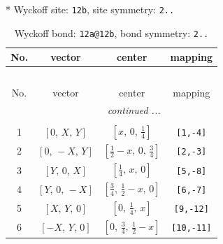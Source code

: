 \documentclass[fleqn,8pt]{jsarticle}
\begin{document}
* Wyckoff site: {\tt 12b}, site symmetry: {\tt 2..}
\renewcommand{\arraystretch}{1.2}
\begin{longtable}{cccc}
\caption{Wyckoff bond: {\tt 12a@12b}, bond symmetry: {\tt 2..}}
 \\
 \hline \hline
No. & vector & center & mapping \\ \hline \endfirsthead

\multicolumn{3}{l}{\tablename\ \thetable{}} \\
 \hline \hline
No. & vector & center & mapping \\ \hline \endhead

 \hline \hline
\multicolumn{3}{r}{\footnotesize\it continued ...} \\ \endfoot

 \hline \hline
\multicolumn{3}{r}{} \\ \endlastfoot

1 & $\left[ 0,\, X,\, Y \right]$ & $\left[ x,\, 0,\, \frac{1}{4} \right]$ & {\tt [1,-4]} \\ \hline
2 & $\left[ 0,\, - X,\, Y \right]$ & $\left[ \frac{1}{2} - x,\, 0,\, \frac{3}{4} \right]$ & {\tt [2,-3]} \\ \hline
3 & $\left[ Y,\, 0,\, X \right]$ & $\left[ \frac{1}{4},\, x,\, 0 \right]$ & {\tt [5,-8]} \\ \hline
4 & $\left[ Y,\, 0,\, - X \right]$ & $\left[ \frac{3}{4},\, \frac{1}{2} - x,\, 0 \right]$ & {\tt [6,-7]} \\ \hline
5 & $\left[ X,\, Y,\, 0 \right]$ & $\left[ 0,\, \frac{1}{4},\, x \right]$ & {\tt [9,-12]} \\ \hline
6 & $\left[ - X,\, Y,\, 0 \right]$ & $\left[ 0,\, \frac{3}{4},\, \frac{1}{2} - x \right]$ & {\tt [10,-11]} \\
\end{longtable}
\renewcommand{\arraystretch}{1.2}
\end{document}
